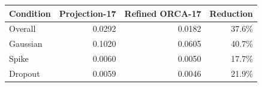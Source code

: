 \begin{tabular}{lrrr}
\toprule
Condition & Projection-17 & Refined ORCA-17 & Reduction \\
\midrule
Overall & 0.0292 & 0.0182 & 37.6\% \\
Gaussian & 0.1020 & 0.0605 & 40.7\% \\
Spike & 0.0060 & 0.0050 & 17.7\% \\
Dropout & 0.0059 & 0.0046 & 21.9\% \\
\bottomrule
\end{tabular}
